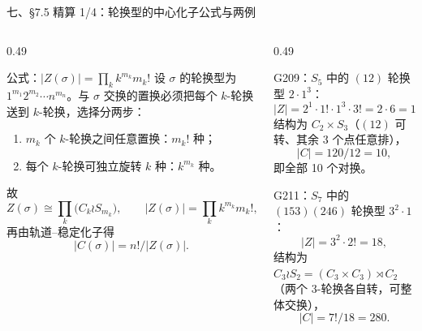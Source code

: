 \documentclass[aspectratio=169,10pt,fontset=none]{ctexbeamer}
\begin{document}
\begin{frame}[t]{七、\S7.5 精算 1/4：轮换型的中心化子公式与两例}
  \begin{columns}[T,onlytextwidth]
    \begin{column}{0.49\textwidth}
      \begin{block}{\footnotesize 公式：$|Z(\sigma)|=\prod_k k^{m_k}m_k!$}
        \scriptsize
        设 $\sigma$ 的轮换型为 $1^{m_1}2^{m_2}\cdots n^{m_n}$。与 $\sigma$ 交换的置换必须把每个 $k$-轮换送到 $k$-轮换，选择分两步：
        \begin{enumerate}\setlength{\itemsep}{1pt}
          \item $m_k$ 个 $k$-轮换之间任意置换：$m_k!$ 种；
          \item 每个 $k$-轮换可独立旋转 $k$ 种：$k^{m_k}$ 种。
        \end{enumerate}
        故
        \[ Z(\sigma)\cong\prod_k\bigl(C_k\wr S_{m_k}\bigr),\qquad |Z(\sigma)|=\prod_k k^{m_k}m_k!, \]
        再由轨道--稳定化子得
        \[ |C(\sigma)|=n!\Big/|Z(\sigma)|. \]
      \end{block}
    \end{column}
    \begin{column}{0.49\textwidth}
      \begin{exampleblock}{\footnotesize G209：$S_5$ 中的 $(12)$}
        \scriptsize
        轮换型 $2\cdot1^3$：
        \[ |Z|=2^1\cdot1!\cdot1^3\cdot3!=2\cdot6=12, \]
        结构为 $C_2\times S_3$（$(12)$ 可转、其余 3 个点任意排），
        \[ |C|=120/12=10, \]
        即全部 10 个对换。
      \end{exampleblock}
      \begin{exampleblock}{\footnotesize G211：$S_7$ 中的 $(153)(246)$}
        \scriptsize
        轮换型 $3^2\cdot1$：
        \[ |Z|=3^2\cdot2!=18, \]
        结构为 $C_3\wr S_2=(C_3\times C_3)\rtimes C_2$（两个 3-轮换各自转，可整体交换），
        \[ |C|=7!/18=280. \]
      \end{exampleblock}
    \end{column}
  \end{columns}
\end{frame}
\end{document}
